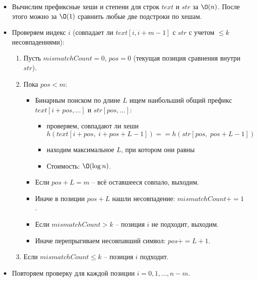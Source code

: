 \begin{enumerate}
\begin{itemize}
      \item Вычислим префиксные хеши и степени для строк $text$ и $str$ за $\O(n)$.
      После этого можно за $\O(1)$ сравнить любые две подстроки по хешам.

      \item Проверяем индекс $i$ (совпадает ли $text[i, i+m-1]$ с $str$ с учетом $\leq k$ несовпадениями):

      \begin{enumerate}
        \item Пусть $mismatchCount = 0$, $pos = 0$ (текущая позиция сравнения внутри $str$).

        \item Пока $pos < m$:
        \begin{itemize}
          \item Бинарным поиском по длине $L$ ищем наибольший общий префикс
          $text[i + pos, \ldots]$ и $str[pos, \ldots]$: 
          
          \begin{itemize}
            \item проверяем, совпадают ли хеши
              $$h(text[i+pos, \; i+pos+L-1]) == h(str[pos, \; pos+L-1])$$

            \item находим максимальное $L$, при котором они равны

            \item Стоимость: $\O(\log n)$.
          \end{itemize} 

          \item Если $pos + L = m$ -- всё оставшееся совпало, выходим.

          \item Иначе в позиции $pos + L$ нашли несовпадение: $mismatchCount += 1$.

          \item Если $mismatchCount > k$ -- позиция $i$ не подходит, выходим.

          \item Иначе перепрыгиваем несовпавший символ: $pos += L + 1$.
        \end{itemize}

        \item Если $mismatchCount \leq k$ -- позиция $i$ подходит.
      \end{enumerate}

      \item Повторяем проверку для каждой позиции $i = 0, 1, \ldots, n - m$.


\end{itemize}
\end{enumerate}
